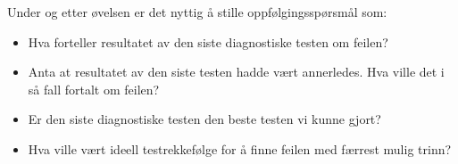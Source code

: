 Under og etter øvelsen er det nyttig å stille oppfølgingsspørsmål som:

\begin{itemize}
\item{} Hva forteller resultatet av den siste diagnostiske testen om feilen?
\item{} Anta at resultatet av den siste testen hadde vært annerledes. Hva ville det i så fall fortalt om feilen?
\item{} Er den siste diagnostiske testen den beste testen vi kunne gjort?
\item{} Hva ville vært ideell testrekkefølge for å finne feilen med færrest mulig trinn?
\end{itemize}



